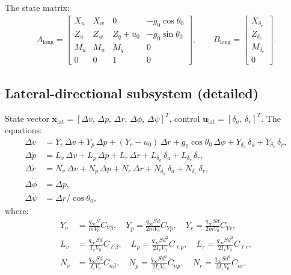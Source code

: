 \documentclass[11pt]{article}
\begin{document}
The state matrix:
\begin{align}
A_{\text{long}} = \begin{bmatrix}
X_u & X_w & 0 & -g_0\cos\theta_0\\
Z_u & Z_w & Z_q+u_0 & -g_0\sin\theta_0\\
M_u & M_w & M_q & 0\\
0 & 0 & 1 & 0
\end{bmatrix},\qquad
B_{\text{long}} = \begin{bmatrix}X_{\delta_e}\\Z_{\delta_e}\\M_{\delta_e}\\0\end{bmatrix}.
\end{align}

\subsection{Lateral-directional subsystem (detailed)}
State vector $\mathbf{x}_{\text{lat}}=[\Delta v,\,\Delta p,\,\Delta r,\,\Delta\phi,\,\Delta\psi]^T$, control $\mathbf{u}_{\text{lat}}=[\delta_a,\,\delta_r]^T$. The equations:
\begin{align}
\Delta\dot v &= Y_v\,\Delta v + Y_p\,\Delta p + (Y_r-u_0)\,\Delta r + g_0\cos\theta_0\,\Delta\phi + Y_{\delta_a}\,\delta_a + Y_{\delta_r}\,\delta_r,\\
\Delta\dot p &= L_v\,\Delta v + L_p\,\Delta p + L_r\,\Delta r + L_{\delta_a}\,\delta_a + L_{\delta_r}\,\delta_r,\\
\Delta\dot r &= N_v\,\Delta v + N_p\,\Delta p + N_r\,\Delta r + N_{\delta_a}\,\delta_a + N_{\delta_r}\,\delta_r,\\
\Delta\dot\phi &= \Delta p,\\
\Delta\dot\psi &= \Delta r/\cos\theta_0,
\end{align}
where:
\begin{align}
Y_v &= \frac{q_\infty S}{mV_0}C_{Y\beta},\quad
Y_p = \frac{q_\infty Sd}{2mV_0}C_{Yp},\quad
Y_r = \frac{q_\infty Sd}{2mV_0}C_{Yr},\\
L_v &= \frac{q_\infty Sd}{I_x V_0}C_{\ell\beta},\quad
L_p = \frac{q_\infty Sd^2}{2I_x V_0}C_{\ell p},\quad
L_r = \frac{q_\infty Sd^2}{2I_x V_0}C_{\ell r},\\
N_v &= \frac{q_\infty Sd}{I_z V_0}C_{n\beta},\quad
N_p = \frac{q_\infty Sd^2}{2I_z V_0}C_{np},\quad
N_r = \frac{q_\infty Sd^2}{2I_z V_0}C_{nr}.
\end{align}
\end{document}
